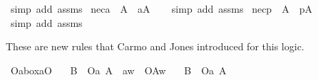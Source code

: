 \begin{isabellebody}
%
\isatagproof
{}\isamarkupfalse%
\ {\isacharparenleft}simp\ add{\isacharcolon}\ assms{\isacharparenright}%
\endisatagproof
{\isafoldproof}%
%
\isadelimproof
\isanewline
%
\endisadelimproof
\isanewline
{}\isamarkupfalse%
\ nec{\isacharunderscore}a{\isacharcolon}\ \ {\isachardoublequoteopen}{\isasymTurnstile}A{\isachardoublequoteclose}\ \ {\isachardoublequoteopen}{\isasymTurnstile}{\isacharparenleft}{\isasymbox}\isactrlsub aA{\isacharparenright}{\isachardoublequoteclose}\isanewline
%
\isadelimproof
\ \ %
\endisadelimproof
%
\isatagproof
{}\isamarkupfalse%
\ {\isacharparenleft}simp\ add{\isacharcolon}\ assms{\isacharparenright}%
\endisatagproof
{\isafoldproof}%
%
\isadelimproof
\isanewline
%
\endisadelimproof
{}\isamarkupfalse%
\ nec{\isacharunderscore}p{\isacharcolon}\ \ {\isachardoublequoteopen}{\isasymTurnstile}A{\isachardoublequoteclose}\ \ {\isachardoublequoteopen}{\isasymTurnstile}{\isacharparenleft}{\isasymbox}\isactrlsub pA{\isacharparenright}{\isachardoublequoteclose}\isanewline
%
\isadelimproof
\ \ %
\endisadelimproof
%
\isatagproof
{}\isamarkupfalse%
\ {\isacharparenleft}simp\ add{\isacharcolon}\ assms{\isacharparenright}%
\endisatagproof
{\isafoldproof}%
%
\isadelimproof
%
\endisadelimproof
%
\isadelimdocument
%
\endisadelimdocument
%
\isatagdocument
%
\isamarkuptrue%
%
\endisatagdocument
{\isafolddocument}%
%
\isadelimdocument
%
\endisadelimdocument
%
\begin{isamarkuptext}%
These are new rules that Carmo and Jones introduced for this logic.%
\end{isamarkuptext}\isamarkuptrue%
\isamarkupfalse%
\ Oa{\isacharunderscore}boxaO{\isacharcolon}\isanewline
\ \ \ {\isachardoublequoteopen}{\isasymTurnstile}{\isacharparenleft}B\ \isactrlbold {\isasymrightarrow}\ {\isacharparenleft}{\isacharparenleft}\isactrlbold {\isasymnot}{\isacharparenleft}{\isasymbox}{\isacharparenleft}{\isacharparenleft}O\isactrlsub a\ A{\isacharparenright}\ \isactrlbold {\isasymrightarrow}\ {\isacharparenleft}{\isacharparenleft}{\isasymbox}\isactrlsub aw{\isacharparenright}\ \isactrlbold {\isasymand}\ O{\isacharbraceleft}A{\isacharbar}w{\isacharbraceright}{\isacharparenright}{\isacharparenright}{\isacharparenright}{\isacharparenright}{\isacharparenright}{\isacharparenright}{\isachardoublequoteclose}\isanewline
\ \ \ {\isachardoublequoteopen}{\isasymTurnstile}{\isacharparenleft}B\ \isactrlbold {\isasymrightarrow}\ {\isacharparenleft}\isactrlbold {\isasymnot}{\isacharparenleft}{\isasymdiamond}{\isacharparenleft}O\isactrlsub a\ A{\isacharparenright}{\isacharparenright}{\isacharparenright}{\isacharparenright}{\isachardoublequoteclose}\isanewline

\end{isabellebody}
